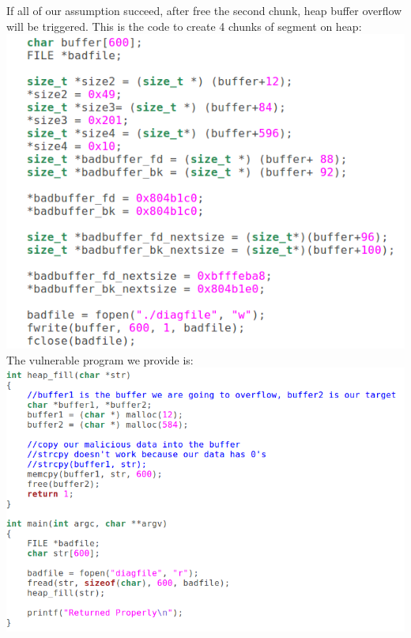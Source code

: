 \documentclass[12pt]{article}
\begin{document}
If all of our assumption succeed, after free the second chunk, heap buffer overflow will be triggered. This is the code to create 4 chunks of segment on heap: \\
\includegraphics[scale=0.5]{diag_code.png}\\
  
The vulnerable program we provide is:\\ 
\includegraphics[scale=0.5]{vul_prog.png}\\
\end{document}
